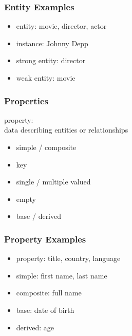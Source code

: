 \documentclass[dvipsnames]{beamer}
\begin{document}
\begin{frame}
  \frametitle{Entity Examples}

  \begin{example}
    \begin{itemize}
      \item entity: movie, director, actor

      \pause
      \item instance: Johnny Depp

      \pause
      \medskip
      \item strong entity: director
      \item weak entity: movie
    \end{itemize}
  \end{example}
\end{frame}

\begin{frame}
  \frametitle{Properties}

  \begin{definition}
    \alert{property}:\\
      data describing entities or relationships

    \pause
    \begin{itemize}
      \item simple / composite
      \item key
      \item single / multiple valued
      \item empty
      \item base / derived
    \end{itemize}
  \end{definition}
\end{frame}

\begin{frame}
  \frametitle{Property Examples}

  \begin{example}
    \begin{itemize}
      \item property: title, country, language

      \pause
      \medskip
      \item simple: first name, last name
      \item composite: full name

      \pause
      \medskip
      \item base: date of birth
      \item derived: age
    \end{itemize}
  \end{example}
\end{frame}
\end{document}
